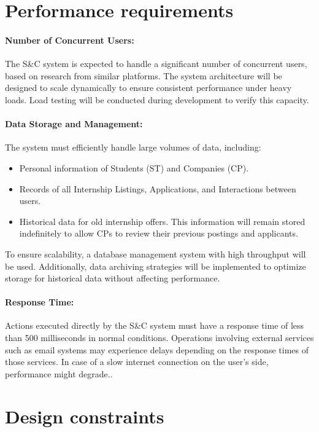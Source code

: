 \newpage

\section{Performance requirements}
\label{sec:performance_requirements}%

\paragraph{Number of Concurrent Users:}
The S\&C system is expected to handle a significant number of concurrent users, based on research from similar platforms. The system architecture will be designed to scale dynamically to ensure consistent performance under heavy loads. Load testing will be conducted during development to verify this capacity.

\paragraph{Data Storage and Management:}
The system must efficiently handle large volumes of data, including:
\begin{itemize}
    \item Personal information of Students (ST) and Companies (CP).
    \item Records of all Internship Listings, Applications, and Interactions between users.
    \item Historical data for old internship offers. This information will remain stored indefinitely to allow CPs to review their previous postings and applicants.
\end{itemize}
To ensure scalability, a database management system with high throughput will be used. Additionally, data archiving strategies will be implemented to optimize storage for historical data without affecting performance.

\paragraph{Response Time:}
Actions executed directly by the S\&C system must have a response time of less than 500 milliseconds in normal conditions. Operations involving external services such as email systems may experience delays depending on the response times of those services. In case of a slow internet connection on the user's side, performance might degrade..

\section{Design constraints}
\label{sec:design_constraints}%

